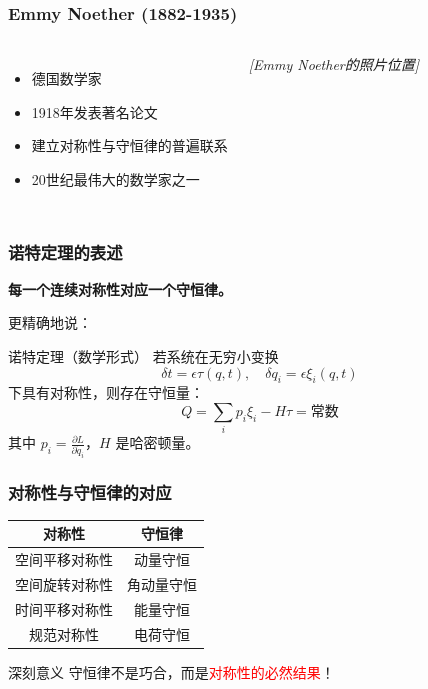 \documentclass[xcolor=dvipsnames]{ctexbeamer}
\begin{document}
\begin{frame}
\frametitle{Emmy Noether (1882-1935)}
\begin{columns}
\begin{itemize}
\item 德国数学家
\item 1918年发表著名论文
\item 建立对称性与守恒律的普遍联系
\item 20世纪最伟大的数学家之一
\end{itemize}

\begin{center}
\textit{[Emmy Noether的照片位置]}
\end{center}
\end{columns}
\end{frame}

\begin{frame}
\frametitle{诺特定理的表述}
\begin{theorem}[诺特定理]
\textbf{每一个连续对称性对应一个守恒律。}
\end{theorem}

\pause

更精确地说：

\begin{block}{诺特定理（数学形式）}
若系统在无穷小变换
$$\delta t = \epsilon \tau(q, t), \quad \delta q_i = \epsilon \xi_i(q, t)$$
下具有对称性，则存在守恒量：
$$Q = \sum_i p_i \xi_i - H \tau = \text{常数}$$
其中 $p_i = \frac{\partial L}{\partial \dot{q}_i}$，$H$ 是哈密顿量。
\end{block}
\end{frame}

\begin{frame}
\frametitle{对称性与守恒律的对应}
\begin{center}
\begin{tabular}{|c|c|}
\hline
\textbf{对称性} & \textbf{守恒律} \\
\hline
空间平移对称性 & 动量守恒 \\
\hline
空间旋转对称性 & 角动量守恒 \\
\hline
时间平移对称性 & 能量守恒 \\
\hline
规范对称性 & 电荷守恒 \\
\hline
\end{tabular}
\end{center}

\pause

\vspace{1em}
\begin{alertblock}{深刻意义}
守恒律不是巧合，而是\textcolor{red}{对称性的必然结果}！
\end{alertblock}
\end{frame}
\end{document}
